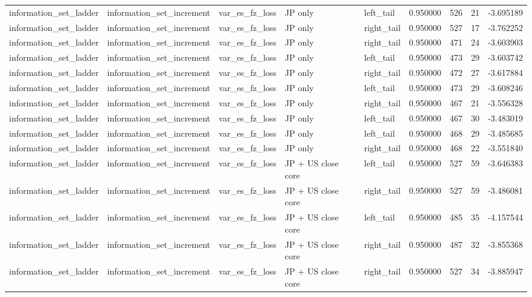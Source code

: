 \begin{tabular}{lllllrrr}
information\_set\_ladder & information\_set\_increment & var\_es\_fz\_loss & JP only & left\_tail & 0.950000 & 526 & 21 & -3.695189 \\
information\_set\_ladder & information\_set\_increment & var\_es\_fz\_loss & JP only & right\_tail & 0.950000 & 527 & 17 & -3.762252 \\
information\_set\_ladder & information\_set\_increment & var\_es\_fz\_loss & JP only & right\_tail & 0.950000 & 471 & 24 & -3.603903 \\
information\_set\_ladder & information\_set\_increment & var\_es\_fz\_loss & JP only & left\_tail & 0.950000 & 473 & 29 & -3.603742 \\
information\_set\_ladder & information\_set\_increment & var\_es\_fz\_loss & JP only & right\_tail & 0.950000 & 472 & 27 & -3.617884 \\
information\_set\_ladder & information\_set\_increment & var\_es\_fz\_loss & JP only & left\_tail & 0.950000 & 473 & 29 & -3.608246 \\
information\_set\_ladder & information\_set\_increment & var\_es\_fz\_loss & JP only & right\_tail & 0.950000 & 467 & 21 & -3.556328 \\
information\_set\_ladder & information\_set\_increment & var\_es\_fz\_loss & JP only & left\_tail & 0.950000 & 467 & 30 & -3.483019 \\
information\_set\_ladder & information\_set\_increment & var\_es\_fz\_loss & JP only & left\_tail & 0.950000 & 468 & 29 & -3.485685 \\
information\_set\_ladder & information\_set\_increment & var\_es\_fz\_loss & JP only & right\_tail & 0.950000 & 468 & 22 & -3.551840 \\
information\_set\_ladder & information\_set\_increment & var\_es\_fz\_loss & JP + US close core & left\_tail & 0.950000 & 527 & 59 & -3.646383 \\
information\_set\_ladder & information\_set\_increment & var\_es\_fz\_loss & JP + US close core & right\_tail & 0.950000 & 527 & 59 & -3.486081 \\
information\_set\_ladder & information\_set\_increment & var\_es\_fz\_loss & JP + US close core & left\_tail & 0.950000 & 485 & 35 & -4.157544 \\
information\_set\_ladder & information\_set\_increment & var\_es\_fz\_loss & JP + US close core & right\_tail & 0.950000 & 487 & 32 & -3.855368 \\
information\_set\_ladder & information\_set\_increment & var\_es\_fz\_loss & JP + US close core & right\_tail & 0.950000 & 527 & 34 & -3.885947 \\

\end{tabular}
